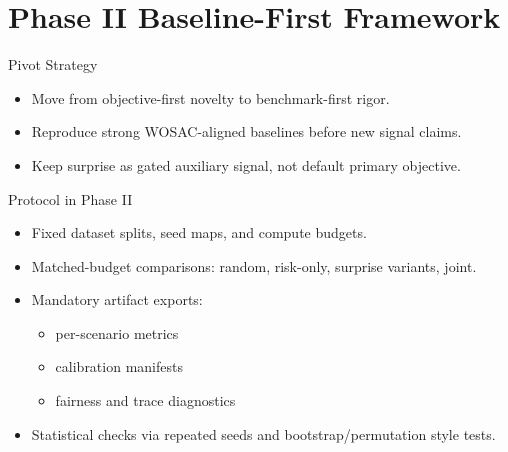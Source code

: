 \section{Phase II Baseline-First Framework}

\begin{frame}{Pivot Strategy}
\begin{itemize}
    \item Move from objective-first novelty to benchmark-first rigor.
    \item Reproduce strong WOSAC-aligned baselines before new signal claims.
    \item Keep surprise as gated auxiliary signal, not default primary objective.
\end{itemize}
\end{frame}

\begin{frame}{Protocol in Phase II}
\begin{itemize}
    \item Fixed dataset splits, seed maps, and compute budgets.
    \item Matched-budget comparisons: random, risk-only, surprise variants, joint.
    \item Mandatory artifact exports:
    \begin{itemize}
        \item per-scenario metrics
        \item calibration manifests
        \item fairness and trace diagnostics
    \end{itemize}
    \item Statistical checks via repeated seeds and bootstrap/permutation style tests.
\end{itemize}
\end{frame}
